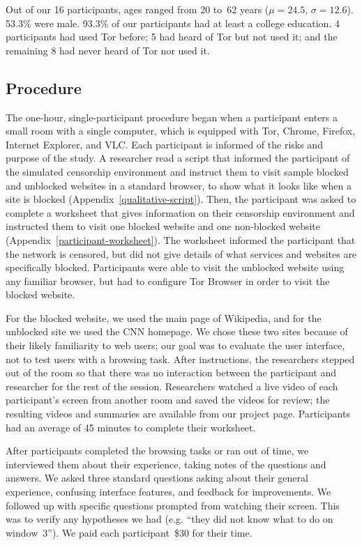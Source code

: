 \documentclass[USenglish,oneside,twocolumn]{article}
\begin{document}
Out of our 16 participants, ages ranged from 20 to~62 years
($\mu = 24.5$, $\sigma = 12.6$). 53.3\% were male. 
93.3\% of our participants had at least
a college education.
4 participants had used Tor before;
5 had heard of Tor but not used it;
and the remaining 8 had never heard of Tor nor used it.


\subsection{Procedure}
The one-hour, single-participant procedure began when a participant enters a small 
room with a single computer, which is equipped with Tor, Chrome, Firefox, Internet Explorer, and VLC.
Each participant is informed of the risks and purpose of the study.
A researcher read a script that informed the participant of the simulated censorship environment and
instruct them to visit sample blocked and unblocked websites
in a standard browser, to show what it looks like when a site is blocked (Appendix~\ref{qualitative-script}).
Then, the participant was asked to complete a worksheet that gives information
on their censorship environment and instructed them
to visit one blocked website and one non-blocked website (Appendix~\ref{participant-worksheet}).
The worksheet informed the participant that the network is censored,
but did not give details of what services and websites are specifically blocked.
Participants were able to visit the unblocked website using any familiar browser,
but had to configure Tor Browser in order to visit the blocked website.
 
For the blocked website, we used the main page of Wikipedia,
and for the unblocked site we used the CNN homepage.
We chose these two sites because of their likely familiarity to web users;
our goal was to evaluate the user interface, not to test users with a browsing task.
After instructions, the researchers stepped out of the room so that there was no interaction
between the participant and researcher for the rest of the session.
Researchers watched a live video of each participant's screen from another room
and saved the videos for review; the resulting videos and summaries
are available from our project page.
Participants had an average of 45 minutes to complete their worksheet. 

After participants completed the browsing tasks or ran out of time,
we interviewed them about their experience,
taking notes of the questions and answers.
We asked three standard questions asking about their general experience, 
confusing interface features, and feedback for improvements. We followed up
with specific questions prompted from watching their screen. 
This was to verify any hypotheses we had (e.g. ``they did not know what to do on window~3'').
We paid each participant~\$30 for their time. 
\end{document}
